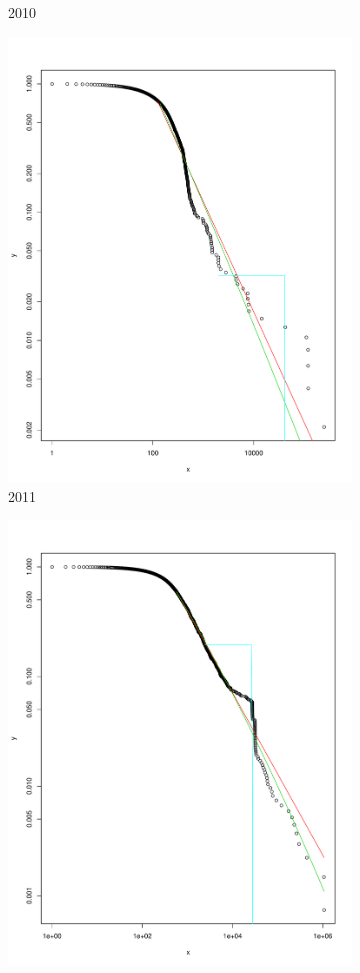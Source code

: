 \documentclass[preprint,12pt]{elsarticle}
\begin{document}
\begin{figure}[H]
\begin{subfigure}{.3\textwidth}
  \caption{2010}
  \label{fig:2010o}
\end{subfigure}
\begin{subfigure}{.3\textwidth}
  \centering
  \includegraphics[width=.8\linewidth]{Bitcoin-graphs/deg-dist-2011-out.pdf}  
  \caption{2011}
  \label{fig:2011o}
\end{subfigure}
\begin{subfigure}{.3\textwidth}
  \centering
  \includegraphics[width=.8\linewidth]{Bitcoin-graphs/deg-dist-2012-out.pdf}  

\end{subfigure}
\end{figure}
\end{document}
